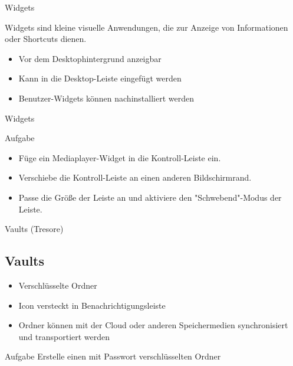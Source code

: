 \begin{frame}{Widgets}

    \pause

    Widgets sind kleine visuelle Anwendungen, die zur Anzeige von Informationen oder Shortcuts
    dienen.

    \pause

    \begin{itemize}
        \item Vor dem Desktophintergrund anzeigbar\pause
        \item Kann in die Desktop-Leiste eingefügt werden\pause
        \item Benutzer-Widgets können nachinstalliert werden
    \end{itemize}
\end{frame}


\begin{frame}{Widgets}
    \begin{alertblock}{Aufgabe}
        \begin{itemize}
            \pause
            \item Füge ein Mediaplayer-Widget in die Kontroll-Leiste ein.\pause
            \item Verschiebe die Kontroll-Leiste an einen anderen Bildschirmrand.\pause
            \item Passe die Größe der Leiste an und aktiviere den "Schwebend"-Modus der Leiste.
        \end{itemize}
    \end{alertblock}
\end{frame}

\begin{frame}{Vaults (Tresore)}
    \subsection{Vaults}\label{subsec:vaults}
    \pause
    \begin{itemize}
        \item Verschlüsselte Ordner\pause
        \item Icon versteckt in Benachrichtigungsleiste\pause
        \item Ordner können mit der Cloud oder anderen Speichermedien synchronisiert und
        transportiert werden
    \end{itemize}

    \pause
    \vspace{0.5cm}
    \begin{alertblock}{Aufgabe}
        Erstelle einen mit Passwort verschlüsselten Ordner
    \end{alertblock}
\end{frame}